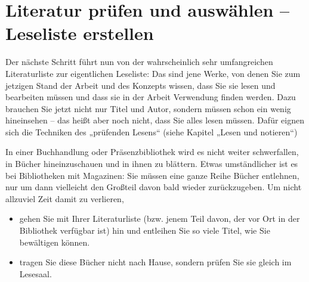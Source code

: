 \documentclass[]{book}
\providecommand{\tightlist}{%
  \setlength{\itemsep}{0pt}\setlength{\parskip}{0pt}}
\theoremstyle{definition}
\theoremstyle{definition}
\theoremstyle{definition}
\theoremstyle{remark}
\begin{document}
\section{Literatur prüfen und auswählen -- Leseliste
erstellen}\label{literatur-prufen-und-auswahlen-leseliste-erstellen}

Der nächste Schritt führt nun von der wahrscheinlich sehr umfangreichen
Literaturliste zur eigentlichen Leseliste: Das sind jene Werke, von
denen Sie zum jetzigen Stand der Arbeit und des Konzepts wissen, dass
Sie sie lesen und bearbeiten müssen und dass sie in der Arbeit
Verwendung finden werden. Dazu brauchen Sie jetzt nicht nur Titel und
Autor, sondern müssen schon ein wenig hineinsehen -- das heißt aber noch
nicht, dass Sie alles lesen müssen. Dafür eignen sich die Techniken des
„prüfenden Lesens`` (siehe Kapitel „Lesen und notieren``)

In einer Buchhandlung oder Präsenzbibliothek wird es nicht weiter
schwerfallen, in Bücher hineinzuschauen und in ihnen zu blättern. Etwas
umständlicher ist es bei Bibliotheken mit Magazinen: Sie müssen eine
ganze Reihe Bücher entlehnen, nur um dann vielleicht den Großteil davon
bald wieder zurückzugeben. Um nicht allzuviel Zeit damit zu verlieren,

\begin{itemize}
\tightlist
\item
  gehen Sie mit Ihrer Literaturliste (bzw. jenem Teil davon, der vor Ort
  in der Bibliothek verfügbar ist) hin und entleihen Sie so viele Titel,
  wie Sie bewältigen können.
\item
  tragen Sie diese Bücher nicht nach Hause, sondern prüfen Sie sie
  gleich im Lesesaal.
\end{itemize}
\end{document}
